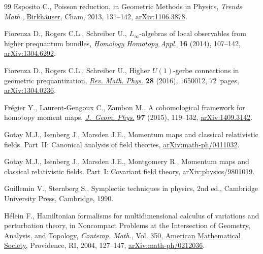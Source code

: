 \documentclass[10pt,a4paper]{amsart}
\numberwithin{equation}{section}
\begin{document}
\begin{thebibliography}{99}
Esposito C., Poisson reduction, in Geometric Methods in Physics, \textit{Trends Math.},
  \href{https://doi.org/10.1007/978-3-319-06248-8_11}{Birkh\"auser}, Cham, 2013, 131--142, \href{https://arxiv.org/abs/1106.3878}{arXiv:1106.3878}.

Fiorenza D., Rogers C.L., Schreiber U., {$L_\infty$}-algebras of local
  observables from higher prequantum bundles, \href{https://doi.org/10.4310/HHA.2014.v16.n2.a6}{\textit{Homology Homotopy Appl.}}
  \textbf{16} (2014), 107--142, \href{https://arxiv.org/abs/1304.6292}{arXiv:1304.6292}.

Fiorenza D., Rogers C.L., Schreiber U., Higher {$U(1)$}-gerbe connections in
  geometric prequantization, \href{https://doi.org/10.1142/S0129055X16500124}{\textit{Rev. Math. Phys.}} \textbf{28} (2016),
  1650012, 72~pages, \href{https://arxiv.org/abs/1304.0236}{arXiv:1304.0236}.

Fr\'egier Y., Laurent-Gengoux C., Zambon M., A cohomological framework for
  homotopy moment maps, \href{https://doi.org/10.1016/j.geomphys.2015.07.010}{\textit{J.~Geom. Phys.}} \textbf{97} (2015), 119--132,
  \href{https://arxiv.org/abs/1409.3142}{arXiv:1409.3142}.

Gotay M.J., Isenberg J., Marsden J.E., Momentum maps and classical relativistic
  fields. Part~{II}: {C}anonical analysis of field theories,
  \href{https://arxiv.org/abs/math-ph/0411032}{arXiv:math-ph/0411032}.

Gotay M.J., Isenberg J., Marsden J.E., Montgomery R., Momentum maps and
  classical relativistic fields. {P}art~{I}: {C}ovariant field theory,
  \href{https://arxiv.org/abs/physics/9801019}{arXiv:physics/9801019}.

Guillemin V., Sternberg S., Symplectic techniques in physics, 2nd ed.,
  Cambridge University Press, Cambridge, 1990.

H\'elein F., Hamiltonian formalisms for multidimensional calculus of variations
  and perturbation theory, in Noncompact Problems at the Intersection of
  Geometry, Analysis, and Topology, \textit{Contemp. Math.}, Vol. 350, \href{https://doi.org/10.1090/conm/350/06342}{American
  Mathematical Society}, Providence, RI, 2004, 127--147,
  \href{https://arxiv.org/abs/math-ph/0212036}{arXiv:math-ph/0212036}.


\end{thebibliography}
\end{document}
